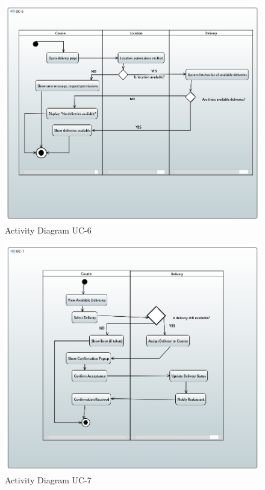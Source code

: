 \begin{figure}[h!]
\begin{center}
\includegraphics[scale=0.5]{FIGS/UC-6.jpg}
    \caption{Activity Diagram UC-6}
    \label{fig:act_diag2}
\end{center}
\end{figure}

\begin{figure}[h!]
\begin{center}
\includegraphics[scale=0.5]{FIGS/UC-7.jpg}
    \caption{Activity Diagram UC-7}
    \label{fig:act_diag3}
\end{center}
\end{figure}

